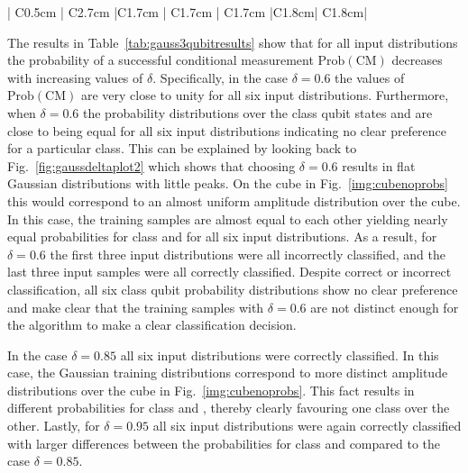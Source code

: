 \begin{table}[H]
\begin{tabular}{| C{0.5cm} | C{2.7cm} |C{1.7cm} | C{1.7cm} | C{1.7cm} |C{1.8cm}| C{1.8cm}|}
      \bottomrule
    \end{tabular}
    \caption{\label{tab:gauss3qubitresults} Amplitude-based kNN algorithm classification results after 1000 runs for various Gaussian distributions centered around six different three-qubit patterns. The Gaussian distributions were created using the coin gate $C(\delta)$. For each pattern three different distributions were prepared and classified by changing the parameter $\delta$: The results for $\delta = 0.6$ are always on top and marked with an empty circle ($\circ$), results for $\delta = 0.85$ are always in the middle marked with a filled circle ($\bullet$) and results for $\delta = 0.95$ are always at the bottom and marked with a triangle ($\triangleright$)}
\end{table}

The results in Table~\ref{tab:gauss3qubitresults} show that for all input distributions the probability of a successful conditional measurement $\mathrm{Prob}(\mathrm{CM})$ decreases with increasing values of $\delta$. Specifically, in the case $\delta = 0.6$ the values of $\mathrm{Prob}(\mathrm{CM})$ are very close to unity for all six input distributions. Furthermore, when $\delta = 0.6$ the probability distributions over the class qubit states \0 and \1 are close to being equal for all six input distributions indicating no clear preference for a particular class. This can be explained by looking back to Fig.~\ref{fig:gaussdeltaplot2} which shows that choosing $\delta = 0.6$ results in flat Gaussian distributions with little peaks. On the cube in Fig.~\ref{img:cubenoprobs} this would correspond to an almost uniform amplitude distribution over the cube. In this case, the training samples are almost equal to each other yielding nearly equal probabilities for class \0 and \1 for all six input distributions. As a result, for $\delta = 0.6$ the first three input distributions were all incorrectly classified, and the last three input samples were all correctly classified. Despite correct or incorrect classification, all six class qubit probability distributions show no clear preference and make clear that the training samples with $\delta = 0.6$ are not distinct enough for the algorithm to make a clear classification decision.

In the case $\delta = 0.85$ all six input distributions were correctly classified. In this case, the Gaussian training distributions correspond to more distinct amplitude distributions over the cube in Fig.~\ref{img:cubenoprobs}. This fact results in different probabilities for class \0 and \1, thereby clearly favouring one class over the other. Lastly, for $\delta = 0.95$ all six input distributions were again correctly classified with larger differences between the probabilities for class \0 and \1 compared to the case $\delta = 0.85$.



